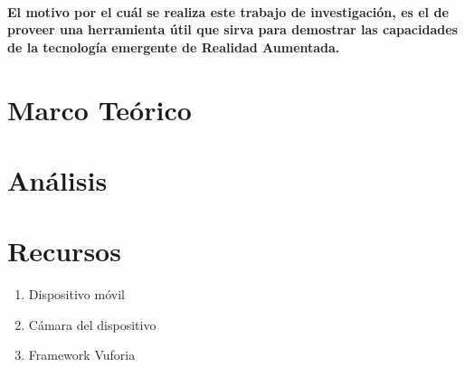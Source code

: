 \documentclass[11pt]{article} %
\begin{document}
\paragraph{
El motivo por el cuál se realiza este trabajo de investigación, es el de proveer una herramienta útil que sirva para demostrar las capacidades de la tecnología emergente de Realidad Aumentada.
 }
\section{Marco Teórico}
\section{Análisis}
\section{Recursos}
\begin{enumerate} 
	 \item Dispositivo móvil
	 \item Cámara del dispositivo
	 \item Framework Vuforia
	
 \end{enumerate}
\end{document}
